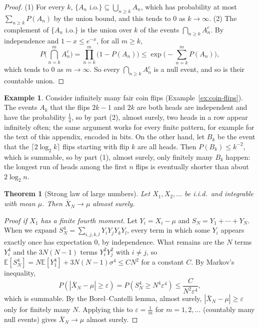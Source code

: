 \documentclass[11pt]{article}
\newcommand{\E}{\mathbb{E}}
\theoremstyle{definition}
\newtheorem{example}[definition]{Example}
\theoremstyle{plain}
\newtheorem{theorem}[definition]{Theorem}
\theoremstyle{remark}
\begin{document}
\begin{proof}
    (1) For every $k$, $\{A_n \text{ i.o.}\} \subseteq \bigcup_{n \geq k} A_n$, which has probability at most $\sum_{n \geq k} P(A_n)$ by the union bound, and this tends to $0$ as $k \to \infty$. (2) The complement of $\{A_n \text{ i.o.}\}$ is the union over $k$ of the events $\bigcap_{n \geq k} A_n^c$. By independence and $1 - x \leq e^{-x}$, for all $m \geq k$,
    \[P\Big(\bigcap_{n=k}^m A_n^c\Big) = \prod_{n=k}^m \big(1 - P(A_n)\big) \leq \exp\Big(-\sum_{n=k}^m P(A_n)\Big),\]
    which tends to $0$ as $m \to \infty$. So every $\bigcap_{n \geq k} A_n^c$ is a null event, and so is their countable union.
\end{proof}

\begin{example}\label{ex:borel-cantelli}
    Consider infinitely many fair coin flips (Example~\ref{ex:coin-flips}). The events $A_k$ that the flips $2k - 1$ and $2k$ are both heads are independent and have the probability $\frac{1}{4}$, so by part (2), almost surely, two heads in a row appear infinitely often; the same argument works for every finite pattern, for example for the text of this appendix, encoded in bits. On the other hand, let $B_k$ be the event that the $\lceil 2\log_2 k\rceil$ flips starting with flip $k$ are all heads. Then $P(B_k) \leq k^{-2}$, which is summable, so by part (1), almost surely, only finitely many $B_k$ happen: the longest run of heads among the first $n$ flips is eventually shorter than about $2\log_2 n$.
\end{example}

\begin{theorem}[Strong law of large numbers]\label{thm:slln}
    Let $X_1, X_2, \ldots$ be i.i.d.\ and integrable with mean $\mu$. Then $\bar X_N \to \mu$ almost surely.
\end{theorem}

\begin{proof}[Proof if $X_1$ has a finite fourth moment]
    Let $Y_i = X_i - \mu$ and $S_N = Y_1 + \cdots + Y_N$. When we expand $S_N^4 = \sum_{i, j, k, l} Y_iY_jY_kY_l$, every term in which some $Y_i$ appears exactly once has expectation $0$, by independence. What remains are the $N$ terms $Y_i^4$ and the $3N(N - 1)$ terms $Y_i^2Y_j^2$ with $i \neq j$, so $\E[S_N^4] = N\E[Y_1^4] + 3N(N - 1)\sigma^4 \leq CN^2$ for a constant $C$. By Markov's inequality,
    \[P(|\bar X_N - \mu| \geq \varepsilon) = P(S_N^4 \geq N^4\varepsilon^4) \leq \frac{C}{N^2\varepsilon^4},\]
    which is summable. By the Borel--Cantelli lemma, almost surely, $|\bar X_N - \mu| \geq \varepsilon$ only for finitely many $N$. Applying this to $\varepsilon = \frac{1}{m}$ for $m = 1, 2, \ldots$ (countably many null events) gives $\bar X_N \to \mu$ almost surely.
\end{proof}
\end{document}

